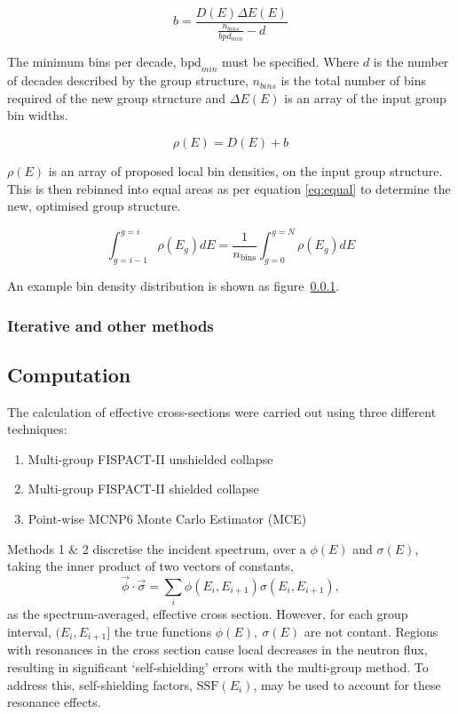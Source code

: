 \begin{equation}
  \label{eq:b}
  b = \frac{D(E) \Delta E(E)}{\frac{n_{bins}}{bpd_{min}} - d}
\end{equation}

The minimum bins per decade, $\mathrm{bpd}_{min}$ must be specified. Where $d$ is the number of decades described by the group structure, $n_{bins}$ is the total number of bins required of the new group structure and $\Delta E(E)$ is an array of the input group bin widths.

\begin{equation}
  \label{eq:offset}
  \rho(E) = D(E) + b
\end{equation}

$\rho(E)$ is an array of proposed local bin densities, on the input group structure. This is then rebinned into equal areas as per equation \ref{eq:equal} to determine the new, optimised group structure.

\begin{equation}
  \label{eq:equal}
  \int_{g=i-1}^{g=i} \rho(E_{g})dE = \frac{1}{n_\mathrm{bins}}\int_{g=0}^{g=N}\rho(E_{g})dE 
\end{equation} 

An example bin density distribution is shown as figure~\ref{}.

\FloatBarrier
\subsubsection{Iterative and other methods}

\subsection{Computation}
\label{subsec:computation}

The calculation of effective cross-sections were carried out using three different techniques:

\begin{enumerate}
  \item Multi-group FISPACT-II unshielded collapse
  \item Multi-group FISPACT-II shielded collapse
  \item Point-wise MCNP6 Monte Carlo Estimator (MCE)
\end{enumerate}

Methods 1 \& 2 discretise the incident spectrum, over a  $\phi(E)$ and $\sigma(E)$, taking the inner product of two vectors of constants,
$$\vec{\phi} \cdot \vec{\sigma} = \sum_i \phi(E_i , E_{i+1}) \sigma(E_i , E_{i+1}),$$
as the spectrum-averaged, effective cross section. However, for each group interval, $(E_{i}, E_{i+1}]$ the true functions $\phi(E),\ \sigma(E)$ are not contant. Regions with resonances in the cross section cause local decreases in the neutron flux, resulting in significant `self-shielding' errors with the multi-group method. To address this, self-shielding factors, $\mathrm{SSF}(E_i)$, may be used to account for these resonance effects. 

